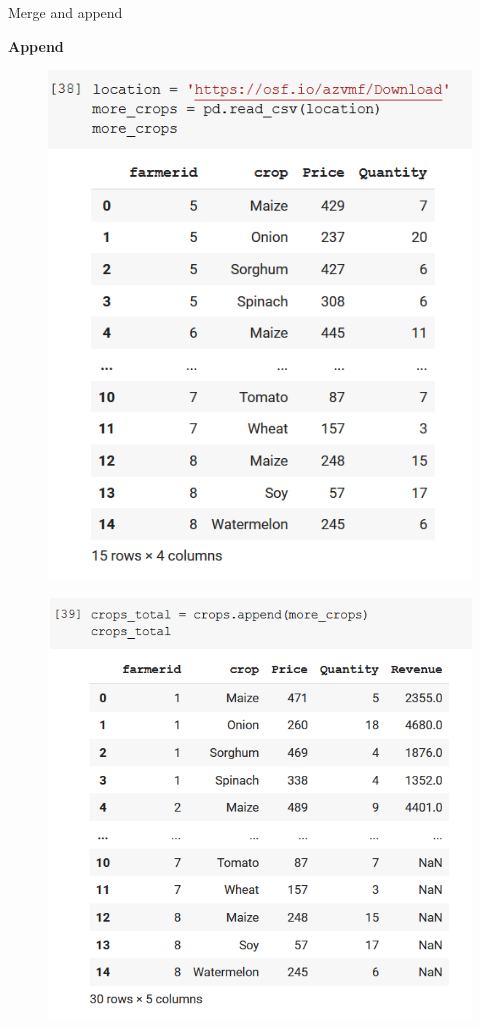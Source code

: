\documentclass[aspectratio=169]{beamer}
\begin{document}
\begin{frame}{Merge and append}

	\textbf{Append}

	\begin{multicols}{2}

		\begin{figure}
			\centering
			\includegraphics[width=0.8\linewidth]{img/more_crops.png}
		\end{figure}

		\begin{figure}
			\centering
			\includegraphics[width=0.9\linewidth]{img/crops_total.png}
		\end{figure}

	\end{multicols}

\end{frame}
\end{document}
